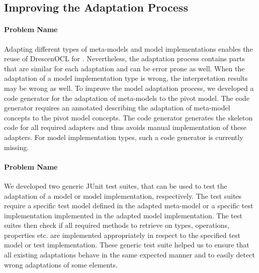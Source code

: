 	\subsection{Improving the Adaptation Process}
	
	\paragraph{Problem Name}
	Adapting different types of meta-models and model
	implementations enables the reuse of DrescenOCL for .
	Nevertheless, the adaptation process contains parts that are similar 
	for each adaptation and can be error
	prone as well. 
	When the adaptation of a model implementation 
	type is wrong, the interpretation results may be wrong as well. 
	To improve the model adaptation process, we developed a code generator 
	for the adaptation of meta-models to the pivot model. The code 
	generator requires an annotated  describing
	the adaptation of meta-model concepts to the pivot model concepts. 
	The code generator generates the skeleton code for all required 
	adapters and thus avoids manual implementation of these adapters. 
	For model implementation types, such a code generator is currently 
	missing.
	
	\paragraph{Problem Name}
	 We developed two generic JUnit test suites, 
	that can be used to test the  adaptation of a model 
	or model implementation, respectively. The test suites require a specific test model defined in the
	adapted meta-model or a specific test implementation implemented in the 
	adapted model implementation. 
	The test suites then check if all required methods to 
	retrieve on types, operations, properties etc. are implemented 
	appropriately in respect to the specified test model or test 
	implementation. These generic test suite helped us to ensure 
	that all existing adaptations behave in the same expected manner
	and to easily detect wrong adaptations of some elements.
